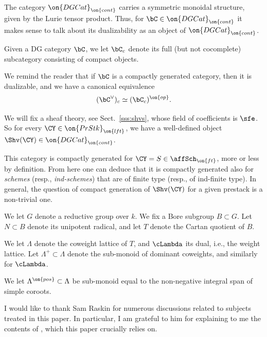 \documentclass[9pt]{amsart}
\theoremstyle{definition}
\theoremstyle{remark}
\newcommand{\secref}[1]{Sect.~\ref{#1}}
\numberwithin{equation}{section}
\begin{document}
The category $\on{DGCat}_{\on{cont}}$ carries a symmetric monoidal structure, given by the Lurie tensor product.
Thus, for $\bC\in \on{DGCat}_{\on{cont}}$ it makes sense to talk about its dualizability as an object of $\on{DGCat}_{\on{cont}}$. 


\sssec{}

Given a DG category $\bC$, we let $\bC_c$ denote its full (but not cocomplete) subcategory consisting
of compact objects. 

\medskip

We remind the reader that if $\bC$ is a compactly generated category, then it is dualizable, and we have a canonical
equivalence 
$$(\bC^\vee)_c\simeq (\bC_c)^{\on{op}}.$$

\sssec{}

We will fix a sheaf theory, see \secref{sss:shvs}, whose field of coefficients is $\sfe$. So for every
$\CY\in \on{PrStk}_{\on{lft}}$, we have a well-defined object $\Shv(\CY)\in \on{DGCat}_{\on{cont}}$.

\medskip

This category is compactly generated for $\CY=S\in \affSch_{\on{ft}}$, more or less by definition. From
here one can deduce that it is compactly generated also for \emph{schemes} (resp., \emph{ind-schemes})
that are of finite type (resp., of ind-finite type). In general, the question of compact generation of $\Shv(\CY)$ 
for a given prestack is a non-trivial one. 

\sssec{}

We let $G$ denote a reductive group over $k$. We fix a Bore subgroup $B\subset G$. Let $N\subset B$
denote its unipotent radical, and let $T$ denote the Cartan quotient of $B$.

\medskip

We let $\Lambda$ denote the coweight lattice of $T$, and $\cLambda$ its dual, i.e., the weight lattice. 
Let $\Lambda^+\subset \Lambda$ denote the sub-monoid of dominant coweights, and similarly for $\cLambda$.

\medskip

We let
$\Lambda^{\on{pos}}\subset \Lambda$ be sub-monoid equal to the non-negative integral span of simple coroots.


I would like to thank Sam Raskin for numerous discussions related to subjects treated in this paper.
In particular, I am grateful to him for explaining to me the contents of \cite{Ras}, which this paper crucially relies on.  
\end{document}
